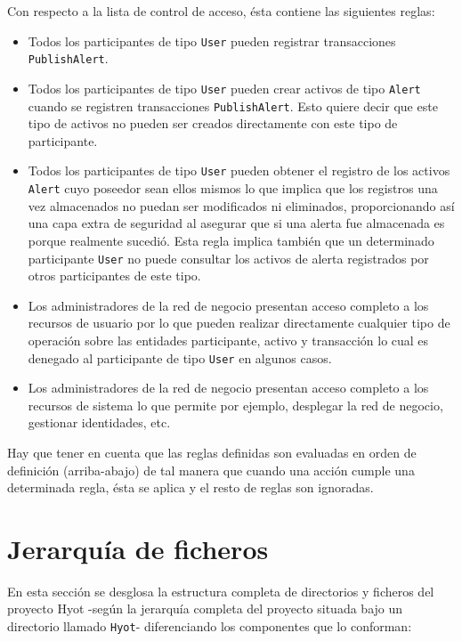 \documentclass[12pt,a4paper, twoside]{report}
\begin{document}
	Con respecto a la lista de control de acceso, ésta contiene las siguientes reglas:
	
	\begin{itemize}
		\item Todos los participantes de tipo \texttt{User} pueden registrar transacciones \texttt{PublishAlert}.
		\item Todos los participantes de tipo \texttt{User} pueden crear activos de tipo \texttt{Alert} cuando se registren transacciones \texttt{PublishAlert}. Esto quiere decir que este tipo de activos no pueden ser creados directamente con este tipo de participante.
		\item Todos los participantes de tipo \texttt{User} pueden obtener el registro de los activos \texttt{Alert} cuyo poseedor sean ellos mismos lo que implica que los registros una vez almacenados no puedan ser modificados ni eliminados, proporcionando así una capa extra de seguridad al asegurar que si una alerta fue almacenada es porque realmente sucedió. Esta regla implica también que un determinado participante \texttt{User} no puede consultar los activos de alerta registrados por otros participantes de este tipo.
		\item Los administradores de la red de negocio presentan acceso completo a los recursos de usuario por lo que pueden realizar directamente cualquier tipo de operación sobre las entidades participante, activo y transacción lo cual es denegado al participante de tipo \texttt{User} en algunos casos.
		\item Los administradores de la red de negocio presentan acceso completo a los recursos de sistema lo que permite por ejemplo, desplegar la red de negocio, gestionar identidades, etc.
	\end{itemize}

	Hay que tener en cuenta que las reglas definidas son evaluadas en orden de definición (arriba-abajo) de tal manera que cuando una acción cumple una determinada regla, ésta se aplica y el resto de reglas son ignoradas.

	\section{Jerarquía de ficheros}
	
	En esta sección se desglosa la estructura completa de directorios y ficheros del proyecto Hyot -según la jerarquía completa del proyecto situada bajo un directorio llamado \texttt{Hyot}- diferenciando los componentes que lo conforman:
		
\end{document}
